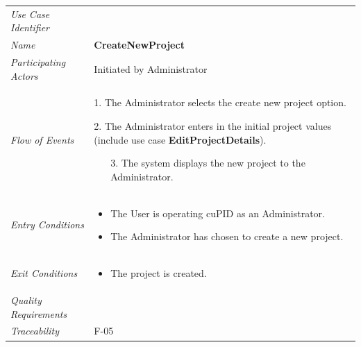 \documentclass[12pt,letterpaper]{article}
\begin{document}
\begin{center}
	\begin{tabu} to 
		\toprule
		Use Case Identifier & \createnewproject{} \\
		Name & {\bf CreateNewProject} \\
		Participating Actors & Initiated by Administrator \\
		Flow of Events & 
		\begin{minipage}[t]{\linewidth}
		    \item[1.] The Administrator selects the create new project option.
		    \item[2.] The Administrator enters in the initial project values (include use case \textbf{EditProjectDetails}).
		    \begin{enumerate}
			    \item[3.] The system displays the new project to the Administrator.
			\end{enumerate}
	    \end{minipage} \\

		Entry Conditions &
		\begin{minipage}[t]{\linewidth}
			\begin{itemize}
			    \item The User is operating cuPID as an Administrator.
			    \item The Administrator has chosen to create a new project.
	        \end{itemize}
	    \end{minipage} \\

		Exit Conditions & 
		\begin{minipage}[t]{\linewidth}
			\begin{itemize}
			    \item The project is created.
	        \end{itemize}
	    \end{minipage}\\

		Quality Requirements & \\

		Traceability & F-05 \\
		\toprule
	\end{tabu}
\end{center}
\end{document}
